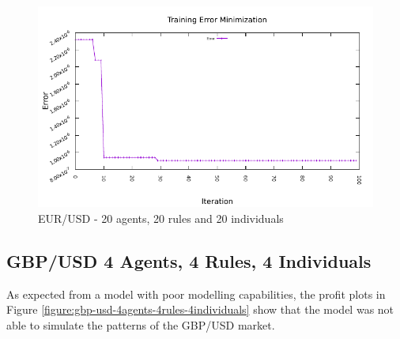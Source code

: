 \begin{figure}[htp]
  \medskip

  \includegraphics[width=.45\textwidth]{img/plots/eur_usd_h1-20agents-20rules-20ind-100gen_error_minimization.pdf}

  \caption{EUR/USD - 20 agents, 20 rules and 20 individuals}
  \label{figure:eur-usd-20agents-20rules-20individuals}
\end{figure}




\newpage

\subsection{GBP/USD 4 Agents, 4 Rules, 4 Individuals}
\label{results:forecast-gbp-usd-4agents-4rules-4individuals}

As expected from a model with poor modelling capabilities, the profit plots in
Figure \ref{figure:gbp-usd-4agents-4rules-4individuals} show that the model was
not able to simulate the patterns of the GBP/USD market.

